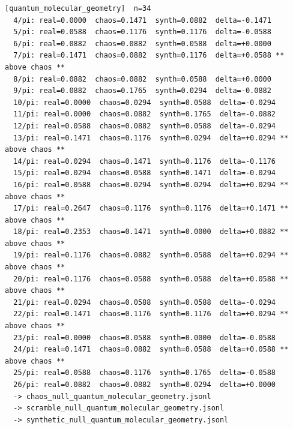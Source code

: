 \documentclass[11pt, letterpaper, openany]{book}
\begin{document}
\begin{empiricalbox}
\begin{lstlisting}[style=terminal]
[quantum_molecular_geometry]  n=34
  4/pi: real=0.0000  chaos=0.1471  synth=0.0882  delta=-0.1471
  5/pi: real=0.0588  chaos=0.1176  synth=0.1176  delta=-0.0588
  6/pi: real=0.0882  chaos=0.0882  synth=0.0588  delta=+0.0000
  7/pi: real=0.1471  chaos=0.0882  synth=0.1176  delta=+0.0588 ** above chaos **
  8/pi: real=0.0882  chaos=0.0882  synth=0.0588  delta=+0.0000
  9/pi: real=0.0882  chaos=0.1765  synth=0.0294  delta=-0.0882
  10/pi: real=0.0000  chaos=0.0294  synth=0.0588  delta=-0.0294
  11/pi: real=0.0000  chaos=0.0882  synth=0.1765  delta=-0.0882
  12/pi: real=0.0588  chaos=0.0882  synth=0.0588  delta=-0.0294
  13/pi: real=0.1471  chaos=0.1176  synth=0.0294  delta=+0.0294 ** above chaos **
  14/pi: real=0.0294  chaos=0.1471  synth=0.1176  delta=-0.1176
  15/pi: real=0.0294  chaos=0.0588  synth=0.1471  delta=-0.0294
  16/pi: real=0.0588  chaos=0.0294  synth=0.0294  delta=+0.0294 ** above chaos **
  17/pi: real=0.2647  chaos=0.1176  synth=0.1176  delta=+0.1471 ** above chaos **
  18/pi: real=0.2353  chaos=0.1471  synth=0.0000  delta=+0.0882 ** above chaos **
  19/pi: real=0.1176  chaos=0.0882  synth=0.0588  delta=+0.0294 ** above chaos **
  20/pi: real=0.1176  chaos=0.0588  synth=0.0588  delta=+0.0588 ** above chaos **
  21/pi: real=0.0294  chaos=0.0588  synth=0.0588  delta=-0.0294
  22/pi: real=0.1471  chaos=0.1176  synth=0.1176  delta=+0.0294 ** above chaos **
  23/pi: real=0.0000  chaos=0.0588  synth=0.0000  delta=-0.0588
  24/pi: real=0.1471  chaos=0.0882  synth=0.0588  delta=+0.0588 ** above chaos **
  25/pi: real=0.0588  chaos=0.1176  synth=0.1765  delta=-0.0588
  26/pi: real=0.0882  chaos=0.0882  synth=0.0294  delta=+0.0000
  -> chaos_null_quantum_molecular_geometry.jsonl
  -> scramble_null_quantum_molecular_geometry.jsonl
  -> synthetic_null_quantum_molecular_geometry.jsonl


\end{lstlisting}
\end{empiricalbox}
\end{document}
